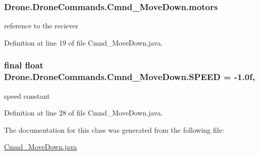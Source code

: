 \subsubsection[{motors}]{ Drone.\+Drone\+Commands.\+Cmnd\+\_\+\+Move\+Down.\+motors\hspace{0.3cm}{\ttfamily [private]}}\label{class_drone_1_1_drone_commands_1_1_cmnd___move_down_a28208f0d23e215b444a6c4283f884a90}
reference to the reciever 

Definition at line 19 of file Cmnd\+\_\+\+Move\+Down.\+java.

\hypertarget{class_drone_1_1_drone_commands_1_1_cmnd___move_down_a83789dc4367eee37bd1a773b87c7282c}{}
\subsubsection[{S\+P\+E\+E\+D}]{\setlength{\rightskip}{0pt plus 5cm}final float Drone.\+Drone\+Commands.\+Cmnd\+\_\+\+Move\+Down.\+S\+P\+E\+E\+D = -\/1.\+0f\hspace{0.3cm}{\ttfamily [static]}, {\ttfamily [private]}}\label{class_drone_1_1_drone_commands_1_1_cmnd___move_down_a83789dc4367eee37bd1a773b87c7282c}
speed constant 

Definition at line 28 of file Cmnd\+\_\+\+Move\+Down.\+java.



The documentation for this class was generated from the following file\+:\begin{DoxyCompactItemize}
\item 
\hyperlink{_cmnd___move_down_8java}{Cmnd\+\_\+\+Move\+Down.\+java}\end{DoxyCompactItemize}
